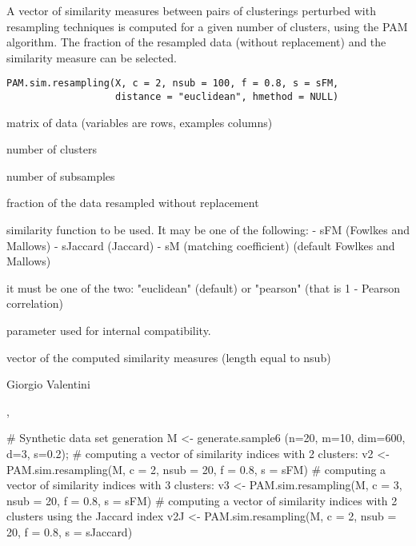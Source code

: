 \documentclass{article}
\begin{document}
\begin{Description}\relax
A vector of similarity measures between pairs of clusterings perturbed with resampling techniques is computed for a given number of clusters,
using the PAM algorithm.
The fraction of the resampled data (without replacement) and the similarity measure can be selected.
\end{Description}
\begin{Usage}
\begin{verbatim}
PAM.sim.resampling(X, c = 2, nsub = 100, f = 0.8, s = sFM, 
                   distance = "euclidean", hmethod = NULL)
\end{verbatim}
\end{Usage}
\begin{Arguments}
\begin{ldescription}
\item[\code{X}] matrix of data (variables are rows, examples columns) 
\item[\code{c}] number of clusters 
\item[\code{nsub}] number of subsamples 
\item[\code{f}] fraction of the data resampled without replacement 
\item[\code{s}] similarity function to be used. It may be one of the following: 
- sFM (Fowlkes and Mallows)
- sJaccard (Jaccard)
- sM (matching coefficient)
(default Fowlkes and Mallows) 
\item[\code{distance}] it must be one of the two: "euclidean" (default) or "pearson" (that is 1 - Pearson correlation) 
\item[\code{hmethod}] parameter used for internal compatibility. 
\end{ldescription}
\end{Arguments}
\begin{Value}
vector of the computed similarity measures (length equal to nsub)
\end{Value}
\begin{Author}\relax
Giorgio Valentini 
\end{Author}
\begin{SeeAlso}\relax
{}, 
\end{SeeAlso}
\begin{Examples}
\begin{ExampleCode}
# Synthetic data set generation
M <- generate.sample6 (n=20, m=10, dim=600, d=3, s=0.2);
# computing a vector of similarity indices with 2 clusters:
v2 <- PAM.sim.resampling(M, c = 2, nsub = 20, f = 0.8, s = sFM)
# computing a vector of similarity indices with 3 clusters:
v3 <- PAM.sim.resampling(M, c = 3, nsub = 20, f = 0.8, s = sFM)
# computing a vector of similarity indices with 2 clusters using the Jaccard index
v2J <- PAM.sim.resampling(M, c = 2, nsub = 20, f = 0.8, s = sJaccard)
\end{ExampleCode}
\end{Examples}
\end{document}
